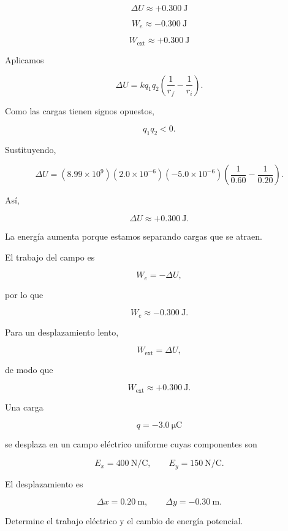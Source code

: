 \begin{respuesta}

\[
\boxed{\Delta U\approx+\SI{0.300}{\joule}}
\]

\[
\boxed{W_e\approx-\SI{0.300}{\joule}}
\]

\[
\boxed{W_{\text{ext}}\approx+\SI{0.300}{\joule}}
\]

\end{respuesta}

\begin{explicacion}

Aplicamos

\[
\Delta U
=
kq_1q_2
\left(
\frac{1}{r_f}
-
\frac{1}{r_i}
\right).
\]

Como las cargas tienen signos opuestos,

\[
q_1q_2<0.
\]

Sustituyendo,

\[
\Delta U
=
(8.99\times10^9)
(2.0\times10^{-6})(-5.0\times10^{-6})
\left(
\frac{1}{0.60}
-
\frac{1}{0.20}
\right).
\]

Así,

\[
\boxed{\Delta U\approx+\SI{0.300}{\joule}}.
\]

La energía aumenta porque estamos separando cargas que se atraen.

El trabajo del campo es

\[
W_e=-\Delta U,
\]

por lo que

\[
\boxed{W_e\approx-\SI{0.300}{\joule}}.
\]

Para un desplazamiento lento,

\[
W_{\text{ext}}=\Delta U,
\]

de modo que

\[
\boxed{W_{\text{ext}}\approx+\SI{0.300}{\joule}}.
\]

\end{explicacion}


\begin{ejercicio}

Una carga

\[
q=-\SI{3.0}{\micro\coulomb}
\]

se desplaza en un campo eléctrico uniforme cuyas componentes son

\[
E_x=\SI{400}{\newton\per\coulomb},
\qquad
E_y=\SI{150}{\newton\per\coulomb}.
\]

El desplazamiento es

\[
\Delta x=\SI{0.20}{\metre},
\qquad
\Delta y=-\SI{0.30}{\metre}.
\]

Determine el trabajo eléctrico y el cambio de energía potencial.

\end{ejercicio}

